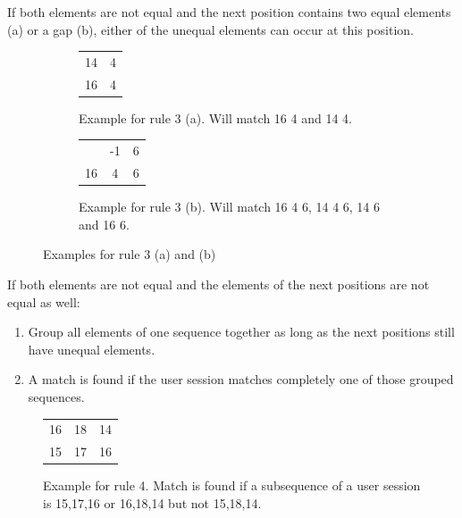 	\begin{rules}
	\item If both elements are not equal and the next position contains two equal elements (a) or a gap (b), either of the unequal elements can occur at this position. 
	\end{rules}
	\begin{figure}[h]
		\centering
		\begin{subfigure}[b]{0.49\textwidth}
		\centering
			\begin{tabular}{cc}
				 14 & 4\\
				 16 & 4\\  
			\end{tabular}
			\caption{Example for rule 3 (a). Will match 16 4 and 14 4.}
			\label{fig:rule3}
		\end{subfigure}
		\begin{subfigure}[b]{0.49\textwidth}
		\centering
			\begin{tabular}{ccc}
		\centering
				14 & -1 & 6\\
				16 & 4  & 6 \\
			\end{tabular}
			\caption{Example for rule 3 (b). Will match 16 4 6, 14 4 6, 14 6 and 16 6. }
		\end{subfigure}
		\caption{Examples for rule 3 (a) and (b)}
		\label{fig:rule3}
	\end{figure}
	\begin{rules}
	\item If both elements are not equal and the elements of the next positions are not equal as well:
		\begin{enumerate}
			\item Group all elements of one sequence together as long as the next positions still have unequal elements.
			\item A match is found if the user session matches completely one of those grouped sequences. 
		\end{enumerate}
	\end{rules}
	\begin{figure}[h]
	\centering
	\begin{tabular}{ccc}
		 16 & 18 & 14 \\
		 15 & 17 & 16 \\  
	\end{tabular}
	\caption{Example for rule 4. Match is found if a subsequence of a user session is 15,17,16 or 16,18,14 but not 15,18,14.}
	\label{fig:rule4}
	\end{figure}

